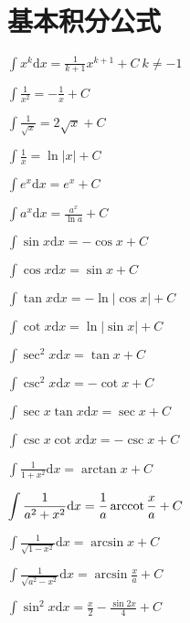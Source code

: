 \section{基本积分公式}

\begin{multicols}{2}
    \begin{spacing}{3}
        \noindent $\displaystyle \int{x^k}\mathrm{d}x = \frac{1}{k+1}x^{k+1} + C \  k\neq -1$

        \noindent $\displaystyle \int{\frac{1}{x^2}} = -\frac{1}{x} + C$

        \noindent $\displaystyle \int{\frac{1}{\sqrt{x}}} = 2\sqrt{x} + C$

        \noindent $\displaystyle \int{\frac{1}{x}} = \ln{\left| x \right|} + C$

        \noindent $\displaystyle \int{e^x}\mathrm{d}x = e^x + C$

        \noindent $\displaystyle \int{a^x}\mathrm{d}x = \frac{a^x}{\ln{a}} + C$

        \noindent $\displaystyle \int{\sin{x}}\mathrm{d}x = -\cos{x} + C$

        \noindent $\displaystyle \int{\cos{x}}\mathrm{d}x = \sin{x} + C$

        \noindent $\displaystyle \int{\tan{x}}\mathrm{d}x = -\ln{\left| \cos{x} \right|} + C$

        \noindent $\displaystyle \int{\cot{x}}\mathrm{d}x = \ln{\left| \sin{x} \right|} + C$

        \noindent $\displaystyle \int{\sec^2{x}}\mathrm{d}x = \tan{x} + C$

        \noindent $\displaystyle \int{\csc^2{x}}\mathrm{d}x = -\cot{x} + C$

        \noindent $\displaystyle \int{\sec{x}\tan{x}}\mathrm{d}x = \sec{x} + C$

        \noindent $\displaystyle \int{\csc{x}\cot{x}}\mathrm{d}x = -\csc{x} + C$

        \noindent $\displaystyle \int{\frac{1}{1 + x^2}}\mathrm{d}x = \arctan{x} + C$

        \noindent $\displaystyle \int{\frac{1}{a^2 + x^2}}\mathrm{d}x = \frac{1}{a}\operatorname{arccot}{\frac{x}{a}} + C$

        \noindent $\displaystyle \int{\frac{1}{\sqrt{1 - x^2}}}\mathrm{d}x = \arcsin{x} + C$

        \noindent $\displaystyle \int{\frac{1}{\sqrt{a^2 - x^2}}}\mathrm{d}x = \arcsin{\frac{x}{a}} + C$

        \noindent $\displaystyle \int{\sin^2{x}}\mathrm{d}x = \frac{x}{2} - \frac{\sin{2x}}{4} + C$


\end{spacing}
\end{multicols}
